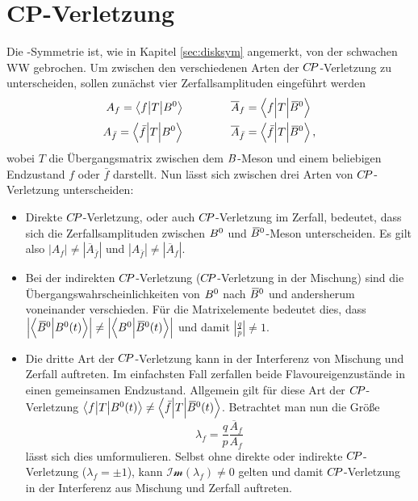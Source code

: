 \section[head={$\CP$-Verletzung},tocentry={$\CP$-Verletzung}]{$\mathbf{CP}$-Verletzung}\label{sec:cpv}

Die \CP-Symmetrie ist, wie in Kapitel \ref{sec:disksym} angemerkt, von der schwachen WW gebrochen. Um zwischen den verschiedenen Arten der $\CP$-Verletzung zu unterscheiden, sollen zunächst vier Zerfallsamplituden eingeführt werden
\begin{equation}
\begin{split}
A_f=\left<f\big|T\big|{{B}^0}\right>&\hspace{1.5cm}\overline{A}_f=\left<f\Big|T\Big|{{\kern 0.18em\overline{\kern -0.18em B}{}}{}^0}\right>\\
A_{\bar{f}}=\left<\bar{f}\Big|T\Big|{{B}^0}\right>&\hspace{1.5cm}\overline{A}_{\bar{f}}=\left<\bar{f}\Big|T\Big|{{\kern 0.18em\overline{\kern -0.18em B}{}}{}^0}\right>,
\end{split}
\end{equation}
wobei $T$ die Übergangsmatrix zwischen dem ${B}$-Meson und einem beliebigen Endzustand $f$ oder $\bar{f}$ darstellt. Nun lässt sich zwischen drei Arten von $\CP$-Verletzung unterscheiden:
\begin{itemize}
\item Direkte $\CP$-Verletzung, oder auch $\CP$-Verletzung im Zerfall, bedeutet, dass sich die Zerfallsamplituden zwischen ${{B}^0}$ und ${{\kern 0.18em\overline{\kern -0.18em B}{}}{}^0}$-Meson unterscheiden. Es gilt also $\left|A_f\right|\neq\left|\overline{A}_{\bar{f}}\right|$ und $\left|A_{\bar{f}}\right|\neq\left|\overline{A}_f\right|$.
\item Bei der indirekten $\CP$-Verletzung ($\CP$-Verletzung in der Mischung) sind die Übergangswahrscheinlichkeiten von ${{B}^0}$ nach ${{\kern 0.18em\overline{\kern -0.18em B}{}}{}^0}$ und andersherum voneinander verschieden. Für die Matrixelemente bedeutet dies, dass $\left|\left<{{\kern 0.18em\overline{\kern -0.18em B}{}}{}^0}\Big|{{B}^0}(t)\right>\right|\neq\left|\left<{{B}^0}\Big|{{\kern 0.18em\overline{\kern -0.18em B}{}}{}^0}(t)\right>\right|$ und damit $\left|\tfrac{q}{p}\right|\neq1$. 
\item Die dritte Art der $\CP$-Verletzung kann in der Interferenz von Mischung und Zerfall auftreten. Im einfachsten Fall zerfallen beide Flavoureigenzustände in einen gemeinsamen Endzustand. Allgemein gilt für diese Art der $\CP$-Verletzung $\left<f\big|T\big|{{B}^0}(t)\right>\neq\left<\bar{f}\Big|T\Big|{{\kern 0.18em\overline{\kern -0.18em B}{}}{}^0}(t)\right>$. Betrachtet man nun die Größe
\begin{equation}
\lambda_f=\frac{q}{p}\frac{\overline{A}_f}{A_f}
\end{equation}
lässt sich dies umformulieren. Selbst ohne direkte oder indirekte $\CP$-Verletzung ($\lambda_f=\pm1$), kann $\mathcal{Im}(\lambda_f)\neq0$ gelten und damit $\CP$-Verletzung in der Interferenz aus Mischung und Zerfall auftreten. 
\end{itemize}
